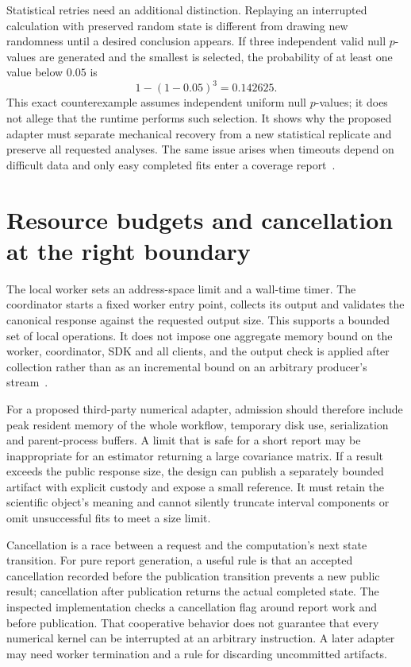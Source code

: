 Statistical retries need an additional distinction. Replaying an interrupted
calculation with preserved random state is different from drawing new
randomness until a desired conclusion appears. If three independent valid
null $p$-values are generated and the smallest is selected, the probability
of at least one value below $0.05$ is
\[
 1-(1-0.05)^3=0.142625.
\]
This exact counterexample assumes independent uniform null $p$-values;
it does not allege that the runtime performs such selection. It shows why
the proposed adapter must separate mechanical recovery from a new statistical
replicate and preserve all requested analyses. The same issue arises when
timeouts depend on difficult data and only easy completed fits enter a
coverage report~\citep{exec13_ops_exact}.

\section{Resource budgets and cancellation at the right boundary}

The local worker sets an address-space limit and a wall-time timer. The
coordinator starts a fixed worker entry point, collects its output and
validates the canonical response against the requested output size. This
supports a bounded set of local operations. It does not impose one aggregate
memory bound on the worker, coordinator, SDK and all clients, and the output
check is applied after collection rather than as an incremental bound on an
arbitrary producer's stream~\citep{exec13_ops_source}.

For a proposed third-party numerical adapter, admission should therefore
include peak resident memory of the whole workflow, temporary disk use,
serialization and parent-process buffers. A limit that is safe for a short
report may be inappropriate for an estimator returning a large covariance
matrix. If a result exceeds the public response size, the design can publish
a separately bounded artifact with explicit custody and expose a small
reference. It must retain the scientific object's meaning and cannot silently
truncate interval components or omit unsuccessful fits to meet a size limit.

Cancellation is a race between a request and the computation's next state
transition. For pure report generation, a useful rule is that an accepted
cancellation recorded before the publication transition prevents a new public
result; cancellation after
publication returns the actual completed state. The inspected implementation
checks a cancellation flag around report work and before publication. That
cooperative behavior does not guarantee that every numerical kernel can be
interrupted at an arbitrary instruction. A later adapter may need worker
termination and a rule for discarding uncommitted artifacts.

